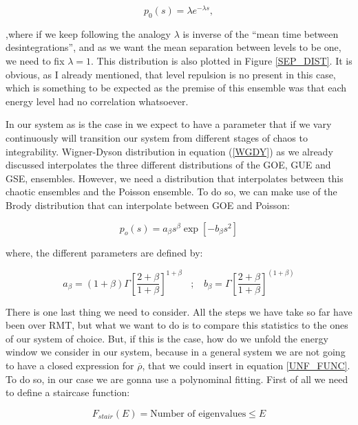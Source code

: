 \documentclass[11pt,a4paper]{article}
\begin{document}
\begin{equation}
    p_0(s)=\lambda e^{-\lambda s},
\end{equation}

{\noindent ,where if we keep following the analogy $\lambda$ is inverse of the \textquotedblleft mean time between desintegrations\textquotedblright, and as we want the mean separation between levels to be one, we need to fix $\lambda=1$. This distribution is also plotted in Figure \ref{SEP_DIST}. It is obvious, as I already mentioned, that level repulsion is no present in this case, which is something to be expected as the premise of this ensemble was that each energy level had no correlation whatsoever.}

In our system as is the case in \cite{Jeong_2025} we expect to have a parameter that if we vary continuously will transition our system from different stages of chaos to integrability. Wigner-Dyson distribution in equation (\ref{WGDY}) as we already discussed interpolates the three different distributions of the GOE, GUE and GSE, ensembles. However, we need a distribution that interpolates between this chaotic ensembles and the Poisson ensemble. To do so, we can make use of the Brody \cite{brody_statistical_1973} distribution that can interpolate between GOE and Poisson:

\begin{equation}
    p_o(s) = a_\beta s^\beta \exp\left[-b_\beta s^2\right]
\end{equation}

{\noindent where, the different parameters are defined by:}

\begin{equation}
    a_\beta=(1+\beta)\Gamma\left[\frac{2+\beta}{1+\beta}\right]^{1+\beta} ~~~~;~~~~ b_\beta=\Gamma\left[\frac{2+\beta}{1+\beta}\right]^{(1+\beta)}
\end{equation}


There is one last thing we need to consider. All the steps we have take so far have been over RMT, but what we want to do is to compare this statistics to the ones of our system of choice. But, if this is the case, how do we unfold the energy window we consider in our system, because in a general system we are not going to have a closed expression for $\overline{\rho}$, that we could insert in equation \ref{UNF_FUNC}. To do so, in our case we are gonna use a polynominal fitting. First of all we need to define a staircase function:

\begin{equation}
    F_{stair}(E) = \text{Number of eigenvalues}\leq E
\end{equation}
\end{document}
